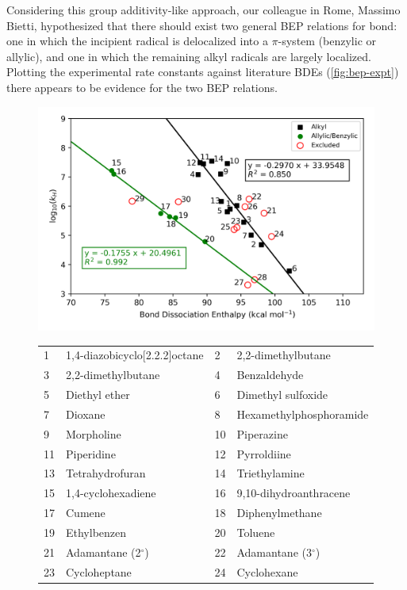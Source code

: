 \begin{doublespace}
Considering this group additivity-like approach, our colleague in Rome, Massimo
Bietti, hypothesized that there should exist two general BEP relations for
 bond: one in which the incipient radical is delocalized into a
$\pi$-system (benzylic or allylic), and one in which the remaining alkyl
radicals are largely localized. Plotting the experimental rate constants against
literature BDEs (\ref{fig:bep-expt}) there appears to be evidence for the two
BEP relations.

\begin{figure}[!htbp]
  \centering
  \includegraphics[width=\textwidth]{figures/bep-expt}
\begin{tabularx}{\textwidth}{| l X l X |}
  \hline
  1 & 1,4-diazobicyclo[2.2.2]octane & 2 & 2,2-dimethylbutane \\
  3 & 2,2-dimethylbutane & 4 & Benzaldehyde \\
  5 & Diethyl ether & 6 & Dimethyl sulfoxide \\
  7 & Dioxane & 8 & Hexamethylphosphoramide \\
  9 & Morpholine & 10 & Piperazine \\
  11 & Piperidine & 12 & Pyrroldiine \\
  13 & Tetrahydrofuran & 14 & Triethylamine \\
  15 & 1,4-cyclohexadiene & 16 & 9,10-dihydroanthracene \\
  17 & Cumene & 18 & Diphenylmethane \\
  19 & Ethylbenzen & 20 & Toluene \\
  21 & Adamantane (2$^\circ$) & 22 & Adamantane (3$^\circ$) \\
  23 & Cycloheptane & 24 & Cyclohexane \\

\end{tabularx}
\end{figure}
\end{doublespace}
